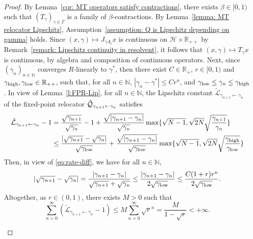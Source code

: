 \documentclass[a4paper,12pt]{article}
\begin{document}
\begin{proof}
    By Lemma~\ref{cor: MT operators satisfy contractions}, there exists $\beta\in[0,1)$ such that $(T_\gamma)_{\gamma\in\Gamma}$ is a family of $\beta$-contractions. By Lemma~\ref{lemma: MT relocator Lipschitz}, Assumption~\ref{assumption: Q is Lipschitz depending on gamma} holds. Since $(x,\gamma)\mapsto J_{\gamma A_i}x$ is continuous on $\mathcal{H}\times\mathbb{R}_{++}$ by Remark~\ref{remark: Lipschitz continuity in resolvent}, it follows that $(x,\gamma)\mapsto T_\gamma x$ is continuous, by algebra and composition of continuous operators. 
    Next, since $(\gamma_n)_{n\in\mathbb{N}}$ converges $R$-linearly to $\gamma^*$, then there exist $C\in\mathbb{R}_{+}$, $r\in[0,1)$ and $\gamma_{\rm high}, \gamma_{\rm low} \in \mathbb{R}_{++}$, such that, for all $n\in\mathbb{N}$, $|\gamma_n - \gamma^*| \leq C r^n$, and $\gamma_{\rm low} \leq \gamma_n \leq \gamma_{\rm high}$. In view of Lemma~\ref{l:FPR-Lip}, for all $n \in \mathbb{N}$, the Lipschitz constant $\check{\mathcal{L}}_{\gamma_{n+1} \gets \gamma_n}$ of the fixed-point relocator $\mathcal{\Tilde{Q}}_{\gamma_{n+1}\gets\gamma_n}$ satisfies 
    \begin{align*}
        \check{\mathcal{L}}_{\gamma_{n+1} \gets \gamma_n} - 1  &=  \frac{\sqrt{\gamma_{n+1}}}{\sqrt{\gamma_n}}-1+\frac{\sqrt{|\gamma_{n+1}-\gamma_n|}}{\sqrt{\gamma_n}}\max\{\sqrt{N-1},\sqrt{2N}\sqrt{\frac{\gamma_{n+1}}{\gamma_n}}\}\\
        &\leq \frac{|\sqrt{\gamma_{n+1}}-\sqrt{\gamma_n}|}{\sqrt{\gamma_{\rm low}}} +\frac{\sqrt{|\gamma_{n+1}-\gamma_n|}}{\sqrt{\gamma_{\rm low}}}\max\{\sqrt{N-1},\sqrt{2N}\sqrt{\frac{\gamma_{\rm high}}{\gamma_{\rm low}}}\}
    \end{align*}
 Then, in view of \eqref{eq:rate-diff}, we have for all $n \in \mathbb{N}$,
 \begin{equation*}
        |\sqrt{\gamma_{n+1}} - \sqrt{\gamma_n}| = \frac{|{\gamma_{n+1}} - {\gamma_n}|}{\sqrt{\gamma_{n+1}} + \sqrt{\gamma_n}}
        \leq \frac{|{\gamma_{n+1}} - {\gamma_n}|}{2\sqrt{\gamma_{\rm low}}} \leq \frac{C(1+r)r^n}{2\sqrt{\gamma_{\rm low}}}.
    \end{equation*}
    Altogether, as $r \in (0,1)$,  there exists $M >0$ such that  \begin{equation*}
        \sum_{n=0}^\infty (\check{\mathcal{L}}_{\gamma_{n+1}\gets\gamma_n} -1) \leq M \sum_{n=0}^\infty\sqrt{r}^n = \frac{M}{1-\sqrt{r}} < +\infty. 
    \end{equation*}%
\begin{enumerate}

\end{enumerate}
\end{proof}
\end{document}

